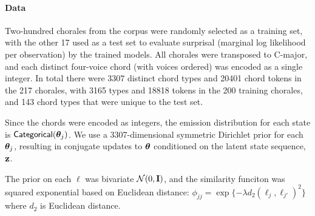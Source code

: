 \paragraph{Data}
Two-hundred chorales from the corpus were randomly selected
as a training set, with the other 17 used as a test set to evaluate
surprisal (marginal log likelihood per observation) by the trained
models.  All chorales were transposed to C-major, and each
distinct four-voice chord (with voices ordered) 
was encoded as a single integer.  In total
there were 3307 distinct chord types and 20401 chord tokens in the 217
chorales, with 3165 types and 18818 tokens in the 200 training
chorales, and 143 chord types that were unique to the test set.

Since the chords were encoded as integers, the emission distribution
for each state is $\mathsf{Categorical}(\boldsymbol{\theta}_j)$.  We use a 3307-dimensional 
symmetric Dirichlet prior for each $\boldsymbol{\theta}_j$, resulting in conjugate 
updates to $\boldsymbol{\theta}$ conditioned on the latent state sequence, $\mathbf{z}$.

The prior on each $\ell$ was bivariate
$\mathcal{N}(0,\mathbf{I})$, and the similarity funciton was squared exponential
based on Euclidean distance: $\phi_{jj} =
\exp\{-\lambda d_2(\ell_j, \ell_{j'})^2\}$ where $d_2$ is Euclidean
distance.  %

